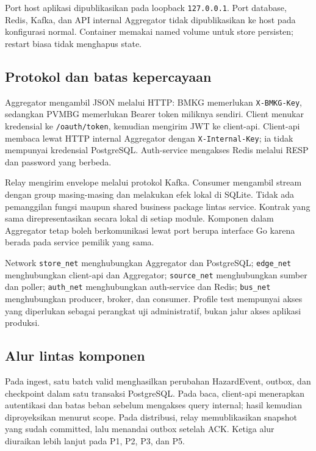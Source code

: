 Port host aplikasi dipublikasikan pada loopback \texttt{127.0.0.1}. Port database, Redis, Kafka, dan API internal Aggregator tidak dipublikasikan ke host pada konfigurasi normal. Container memakai named volume untuk store persisten; restart biasa tidak menghapus state.

\subsection{Protokol dan batas kepercayaan}
Aggregator mengambil JSON melalui HTTP: BMKG memerlukan \texttt{X-BMKG-Key}, sedangkan PVMBG memerlukan Bearer token miliknya sendiri. Client menukar kredensial ke \texttt{/oauth/token}, kemudian mengirim JWT ke client-api. Client-api membaca lewat HTTP internal Aggregator dengan \texttt{X-Internal-Key}; ia tidak mempunyai kredensial PostgreSQL. Auth-service mengakses Redis melalui RESP dan password yang berbeda.

Relay mengirim envelope melalui protokol Kafka. Consumer mengambil stream dengan group masing-masing dan melakukan efek lokal di SQLite. Tidak ada pemanggilan fungsi maupun shared business package lintas service. Kontrak yang sama direpresentasikan secara lokal di setiap module. Komponen dalam Aggregator tetap boleh berkomunikasi lewat port berupa interface Go karena berada pada service pemilik yang sama.

Network \texttt{store\_net} menghubungkan Aggregator dan PostgreSQL; \texttt{edge\_net} menghubungkan client-api dan Aggregator; \texttt{source\_net} menghubungkan sumber dan poller; \texttt{auth\_net} menghubungkan auth-service dan Redis; \texttt{bus\_net} menghubungkan producer, broker, dan consumer. Profile test mempunyai akses yang diperlukan sebagai perangkat uji administratif, bukan jalur akses aplikasi produksi.

\subsection{Alur lintas komponen}
Pada ingest, satu batch valid menghasilkan perubahan HazardEvent, outbox, dan checkpoint dalam satu transaksi PostgreSQL. Pada baca, client-api menerapkan autentikasi dan batas beban sebelum mengakses query internal; hasil kemudian diproyeksikan menurut scope. Pada distribusi, relay memublikasikan snapshot yang sudah committed, lalu menandai outbox setelah ACK. Ketiga alur diuraikan lebih lanjut pada P1, P2, P3, dan P5.

